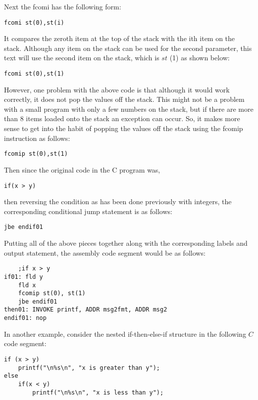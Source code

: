 \documentclass[10pt]{article}
\begin{document}
Next the fcomi has the following form:

\begin{verbatim}
fcomi st(0),st(i)
\end{verbatim}

It compares the zeroth item at the top of the stack with the ith item on the stack. Although any item on the stack can be used for the second parameter, this text will use the second item on the stack, which is $s t$ (1) as shown below:

\begin{verbatim}
fcomi st(0),st(1)
\end{verbatim}

However, one problem with the above code is that although it would work correctly, it does not pop the values off the stack. This might not be a problem with a small program with only a few numbers on the stack, but if there are more than 8 items loaded onto the stack an exception can occur. So, it makes more sense to get into the habit of popping the values off the stack using the fcomip instruction as follows:

\begin{verbatim}
fcomip st(0),st(1)
\end{verbatim}

Then since the original code in the C program was,

\begin{verbatim}
if(x > y)
\end{verbatim}

then reversing the condition as has been done previously with integers, the corresponding conditional jump statement is as follows:

\begin{verbatim}
jbe endif01
\end{verbatim}

Putting all of the above pieces together along with the corresponding labels and output statement, the assembly code segment would be as follows:

\begin{verbatim}
    ;if x > y
if01: fld y
    fld x
    fcomip st(0), st(1)
    jbe endif01
then01: INVOKE printf, ADDR msg2fmt, ADDR msg2
endif01: nop
\end{verbatim}

In another example, consider the nested if-then-else-if structure in the following $C$ code segment:

\begin{verbatim}
if (x > y)
    printf("\n%s\n", "x is greater than y");
else
    if(x < y)
        printf("\n%s\n", "x is less than y");
\end{verbatim}
\end{document}
